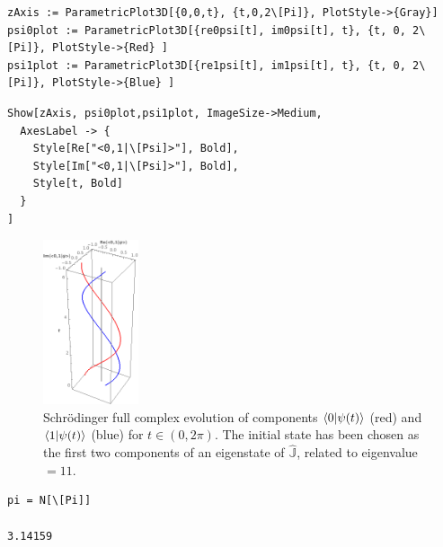 \begin{Verbatim}
zAxis := ParametricPlot3D[{0,0,t}, {t,0,2\[Pi]}, PlotStyle->{Gray}]
psi0plot := ParametricPlot3D[{re0psi[t], im0psi[t], t}, {t, 0, 2\[Pi]}, PlotStyle->{Red} ]
psi1plot := ParametricPlot3D[{re1psi[t], im1psi[t], t}, {t, 0, 2\[Pi]}, PlotStyle->{Blue} ]
\end{Verbatim}

\begin{Verbatim}
Show[zAxis, psi0plot,psi1plot, ImageSize->Medium,
  AxesLabel -> {
    Style[Re["<0,1|\[Psi]>"], Bold],
    Style[Im["<0,1|\[Psi]>"], Bold],
    Style[t, Bold]
  }
]
\end{Verbatim}
\begin{figure}[!h]
  \centering
  \includegraphics[width=0.25\textwidth]{img/qubit-evo-schrod.png}
  \caption[(from notebook)]{
    Schr{\"o}dinger full complex evolution of components
    $\braket{0}{\psi(t)}$ (red) and 
    $\braket{1}{\psi(t)}$ (blue) for
    $t \in (0, 2\pi) $. The initial state
    has been chosen as the first two components of an eigenstate of
    $\hat{\mathbb{J}}$, related to eigenvalue $= 11$.
  }
\end{figure}

\begin{Verbatim}
pi = N[\[Pi]]

3.14159
\end{Verbatim}


